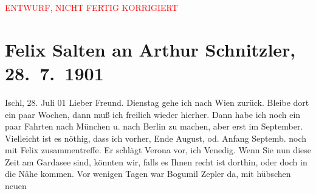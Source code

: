 
\begin{center}
            \textcolor{red}{ENTWURF, NICHT FERTIG KORRIGIERT}
                      \end{center}
            
         
         \renewcommand{\erwaehntePersonen}{Personen: Friedrich von Bodenstedt, Hugo Felix, Mirzä Şäfi Vazeh, Josef Willomitzer, Bogumil Zepler}
         \renewcommand{\erwaehnteOrte}{Orte: Bad Ischl, Berlin, Lago di Garda, München, Venedig, Verona, Wien}
         \renewcommand{\erwaehnteWerke}{Werke: Der einsame Weg. Schauspiel in fünf Akten, Die Gedenktafel der Prinzessin Anna, Die Insel. Monatsschrift mit Buchschmuck und Illustrationen, Hafisa, Neue Loreley}
               \section[Felix Salten an Arthur Schnitzler, 28. 7. 1901]{ Felix Salten an Arthur Schnitzler, 28. 7. 1901}\nopagebreak{}\rehead{ }\begin{ledgroupsized}[t]{13cm}\normalsize\beginnumbering \toendnotes[C]{\smallbreak\pagebreak[2]} 
\toendnotes[C]{\smallbreak}\pstart
           \raggedleft{}{\pb} Ischl, 28. Juli 01\pend
           \pstart
           Lieber Freund. Dienstag gehe ich nach Wien zurück.
               Bleibe dort ein paar Wochen, dann muß ich freilich wieder hierher. Dann habe ich noch
               ein paar Fahrten nach München u. nach Berlin zu machen, aber erst im September.
               Vielleicht ist es nöthig, dass ich vorher, Ende August, od. Anfang
                  Septemb. noch mit Felix
               zusammentreffe. Er schlägt Verona vor, ich Venedig. Wenn Sie nun diese Zeit am Gardasee sind, könnten wir, falls es Ihnen recht
               ist dorthin, oder doch in die Nähe kommen. Vor wenigen Tagen war Bogumil Zepler da, mit hübschen neuen \label{K_L03316-22v}
\end{ledgroupsized}
